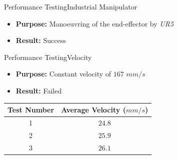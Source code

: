 \begin{frame}{Performance Testing}{Industrial Manipulator}
 \begin{itemize}
        \item \textbf{Purpose:} Manoeuvring of the end-effector by \textit{UR5}
        \item \textbf{Result:} Success
    \end{itemize}
    \vspace{4pt}
\end{frame}

\begin{frame}{Performance Testing}{Velocity}
\begin{itemize}
    \item \textbf{Purpose:} Constant velocity of $167$ $mm/s$
    \item \textbf{Result:} Failed
\end{itemize}
\vspace{5pt}
\begin{table}[!h]
    \centering
\begin{tabular}{cc}
    \hline
     \rowcolor{beamer@barcolor} Test Number & Average Velocity ($mm/s$)  \\
     \hline
     1 & $24.8$ \\
     \rowcolor{beamer@barcolor} 2 & $25.9$  \\
     3 & $26.1$ \\
     \hline
\end{tabular}
\end{table}
\end{frame}

